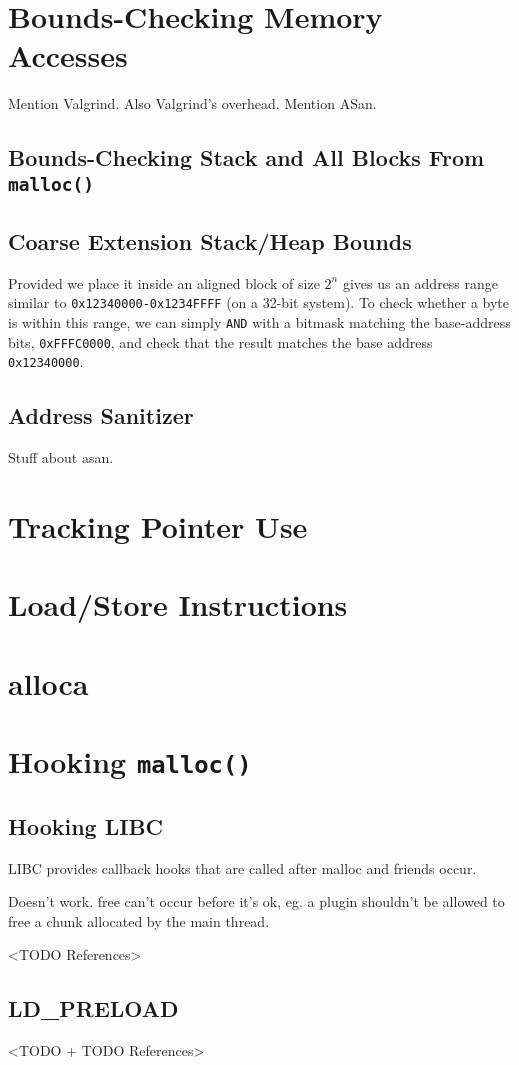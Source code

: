 \section {Bounds-Checking Memory Accesses}

Mention Valgrind. Also Valgrind's overhead. Mention ASan.

\subsection {Bounds-Checking Stack and All Blocks From \texttt{malloc()} }

\subsection {Coarse Extension Stack/Heap Bounds}

Provided we place it inside an aligned block of size $2^n$ gives us an address
range similar to \texttt{0x12340000-0x1234FFFF} (on a 32-bit system). To check
whether a byte is within this range, we can simply \texttt{AND} with a bitmask
matching the base-address bits, \texttt{0xFFFC0000}, and check that the result
matches the base address \texttt{0x12340000}.

\subsection {Address Sanitizer}

Stuff about asan.

\section {Tracking Pointer Use}

\section {Load/Store Instructions}

\section {alloca}

\section {Hooking \texttt{malloc()}}

\subsection {Hooking LIBC}

LIBC provides callback hooks that are called after malloc and friends occur.

Doesn't work. free can't occur before it's ok, eg. a plugin shouldn't be
allowed to free a chunk allocated by the main thread.

<TODO References>

\subsection {LD\_PRELOAD}

<TODO + TODO References>
